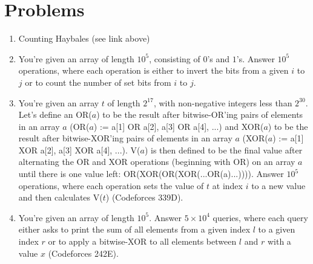 \documentclass[11pt]{article}
\begin{document}
\section{Problems}
\begin{enumerate}
    \item Counting Haybales (see link above)
    \item You're given an array of length $10^5$, consisting of $0$'s and $1$'s. Answer $10^5$ operations, where each operation is either to invert the bits from a given $i$ to $j$ or to count the number of set bits from $i$ to $j$.
    \item You're given an array $t$ of length $2^{17}$, with non-negative integers less than $2^{30}$. Let's define an OR($a$) to be the result after bitwise-OR'ing pairs of elements in an array $a$ (OR($a$) := {a[1] OR a[2], a[3] OR a[4], ...}) and XOR($a$) to be the result after bitwise-XOR'ing pairs of elements in an array $a$ (XOR($a$) := {a[1] XOR a[2], a[3] XOR a[4], ...}). V($a$) is then defined to be the final value after alternating the OR and XOR operations (beginning with OR) on an array $a$ until there is one value left: OR(XOR(OR(XOR(...OR(a)...)))). Answer $10^5$ operations, where each operation sets the value of $t$ at index $i$ to a new value and then calculates V($t$) (Codeforces 339D).
    \item You're given an array of length $10^5$. Answer $5 \times 10^4$ queries, where each query either asks to print the sum of all elements from a given index $l$ to a given index $r$ or to apply a bitwise-XOR to all elements between $l$ and $r$ with a value $x$ (Codeforces 242E).
\end{enumerate}
\end{document}
